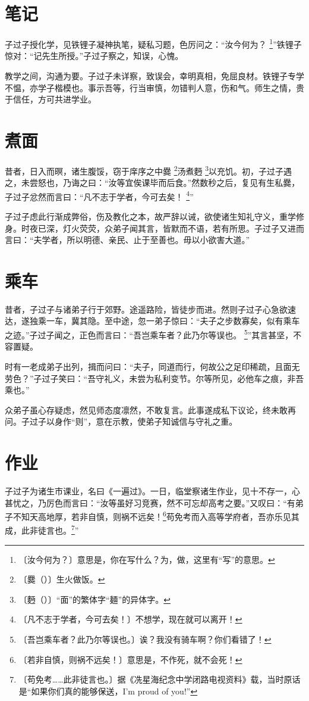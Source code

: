 \documentclass[b5paper,zihao=-4]{ctexbook}
\newcommand{\zhushi}[2]{#1 \footnote{〔#1〕#2}}
\newcommand{\zhushipy}[3]{#1 \footnote{〔#2〕#3}}
\begin{document}
\chapter{笔记}

子过子授化学，见铁锂子凝神执笔，疑私习题，色厉问之：“\zhushi{汝今何为？}{意思是，你在写什么？为，做，这里有“写”的意思。}”铁锂子惊对：“记先生所授。”子过子察之，知误，心愧。

教学之间，沟通为要。子过子未详察，致误会，幸明真相，免屈良材。铁锂子专学不愠，亦学子楷模也。事示吾等，行当审慎，勿错判人意，伤和气。师生之情，贵于信任，方可共进学业。

\chapter{煮面}

昔者，日入而暝，诸生腹馁，窃于庠序之中\zhushipy{爨}{爨（）}{生火做饭。}汤煮\zhushipy{麪}{麪（）}{“面”的繁体字“麺”的异体字。}以充饥。初，子过子遇之，未尝怒也，乃诲之曰：“汝等宜俟课毕而后食。”然数秒之后，复见有生私爨，子过子忿然而言曰：“\zhushi{凡不志于学者，今可去矣！}{不想学，现在就可以离开！}”

子过子虑此行渐成弊俗，伤及教化之本，故严辞以诫，欲使诸生知礼守义，重学修身。时夜已深，灯火荧荧，众弟子闻其言，皆默而不语，若有所思。子过子又进而言曰：“夫学者，所以明德、亲民、止于至善也。毋以小欲害大道。”

\chapter{乘车}

昔者，子过子与诸弟子行于郊野。途遥路险，皆徒步而进。然则子过子心急欲速达，遂独乘一车，冀其隐。至中途，忽一弟子惊曰：“夫子之步数寡矣，似有乘车之迹。”子过子闻之，正色而言曰：“\zhushi{吾岂乘车者？此乃尔等误也。}{诶？我没有骑车啊？你们看错了！}”其言甚坚，不容置疑。

时有一老成弟子出列，揖而问曰：“夫子，同道而行，何故公之足印稀疏，且面无劳色？”子过子笑曰：“吾守礼义，未尝为私利变节。尔等所见，必他车之痕，非吾乘也。”

众弟子虽心存疑虑，然见师态度凛然，不敢复言。此事遂成私下议论，终未敢再问。子过子以身作“则”，意在示教，使弟子知诚信与守礼之重。

\chapter{作业}

子过子为诸生市课业，名曰《一遍过》。一日，临堂察诸生作业，见十不存一，心甚忧之，乃厉色而言曰：“汝等虽好习竞赛，然不可忘却高考之要。”又叹曰：“有弟子不知天高地厚，若非自慎，则祸不远矣！\footnote{〔若非自慎，则祸不远矣！〕意思是，不作死，就不会死！}苟免考而入高等学府者，吾亦乐见其成，此非徒言也。\footnote{〔苟免考……此非徒言也。〕据《冼星海纪念中学闭路电视资料》载，当时原话是“如果你们真的能够保送，I'm proud of you!”}”
\end{document}
